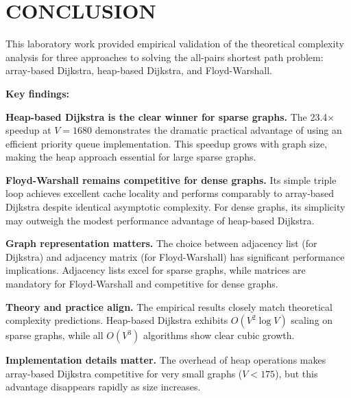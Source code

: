 \documentclass[12pt, a4paper]{report}
\begin{document}
\chapter{CONCLUSION}

This laboratory work provided empirical validation of the theoretical complexity analysis for three approaches to solving the all-pairs shortest path problem: array-based Dijkstra, heap-based Dijkstra, and Floyd-Warshall.

\textbf{Key findings:}

\begin{dashenum}
  \item \textbf{Heap-based Dijkstra is the clear winner for sparse graphs.} The 23.4$\times$ speedup at $V = 1680$ demonstrates the dramatic practical advantage of using an efficient priority queue implementation. This speedup grows with graph size, making the heap approach essential for large sparse graphs.
  
  \item \textbf{Floyd-Warshall remains competitive for dense graphs.} Its simple triple loop achieves excellent cache locality and performs comparably to array-based Dijkstra despite identical asymptotic complexity. For dense graphs, its simplicity may outweigh the modest performance advantage of heap-based Dijkstra.
  
  \item \textbf{Graph representation matters.} The choice between adjacency list (for Dijkstra) and adjacency matrix (for Floyd-Warshall) has significant performance implications. Adjacency lists excel for sparse graphs, while matrices are mandatory for Floyd-Warshall and competitive for dense graphs.
  
  \item \textbf{Theory and practice align.} The empirical results closely match theoretical complexity predictions. Heap-based Dijkstra exhibits $O(V^2 \log V)$ scaling on sparse graphs, while all $O(V^3)$ algorithms show clear cubic growth.
  
  \item \textbf{Implementation details matter.} The overhead of heap operations makes array-based Dijkstra competitive for very small graphs ($V < 175$), but this advantage disappears rapidly as size increases.
\end{dashenum}
\end{document}

